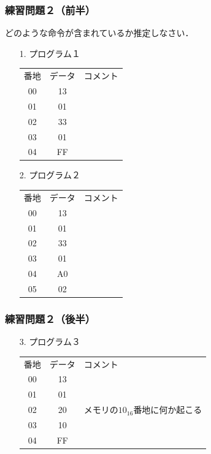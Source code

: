 \documentclass{beamer}                 %
\begin{document}
\begin{frame}
  \frametitle{練習問題２（前半）}
  どのような命令が含まれているか推定しなさい．
  \begin{enumerate}
    \item[1.] プログラム１\\
      \begin{tabular}{c c l}
        番地 & データ & コメント \\
        00   & 13     &          \\
        01   & 01     &          \\
        02   & 33     &          \\
        03   & 01     &          \\
        04   & FF     &          \\
      \end{tabular}
    \item[2.] プログラム２\\
      \begin{tabular}{c c l}
        番地 & データ & コメント \\
        00   & 13     &          \\
        01   & 01     &          \\
        02   & 33     &          \\
        03   & 01     &          \\
        04   & A0     &          \\
        05   & 02     &          \\
      \end{tabular}
  \end{enumerate}
\end{frame}

\begin{frame}
  \frametitle{練習問題２（後半）}
  \begin{enumerate}
    \item[3.] プログラム３\\
      \begin{tabular}{c c l}
        番地 & データ & コメント \\
        00   & 13     &          \\
        01   & 01     &          \\
        02   & 20     &  メモリの$10_{16}$番地に何か起こる \\
        03   & 10     &          \\
        04   & FF     &          \\
      \end{tabular}
  \end{enumerate}
  \vfill
\end{frame}
\end{document}
